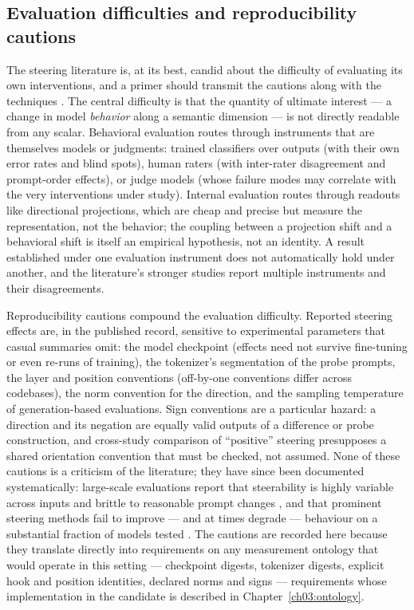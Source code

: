 \subsection{Evaluation difficulties and reproducibility cautions}\label{ch02:steering:evaluation}

The steering literature is, at its best, candid about the difficulty of evaluating its own interventions, and a primer should transmit the cautions along with the techniques \cite{zourepe}. The central difficulty is that the quantity of ultimate interest --- a change in model \emph{behavior} along a semantic dimension --- is not directly readable from any scalar. Behavioral evaluation routes through instruments that are themselves models or judgments: trained classifiers over outputs (with their own error rates and blind spots), human raters (with inter-rater disagreement and prompt-order effects), or judge models (whose failure modes may correlate with the very interventions under study). Internal evaluation routes through readouts like directional projections, which are cheap and precise but measure the representation, not the behavior; the coupling between a projection shift and a behavioral shift is itself an empirical hypothesis, not an identity. A result established under one evaluation instrument does not automatically hold under another, and the literature's stronger studies report multiple instruments and their disagreements.

Reproducibility cautions compound the evaluation difficulty. Reported steering effects are, in the published record, sensitive to experimental parameters that casual summaries omit: the model checkpoint (effects need not survive fine-tuning or even re-runs of training), the tokenizer's segmentation of the probe prompts, the layer and position conventions (off-by-one conventions differ across codebases), the norm convention for the direction, and the sampling temperature of generation-based evaluations. Sign conventions are a particular hazard: a direction and its negation are equally valid outputs of a difference or probe construction, and cross-study comparison of ``positive'' steering presupposes a shared orientation convention that must be checked, not assumed. None of these cautions is a criticism of the literature; they have since been documented systematically: large-scale evaluations report that steerability is highly variable across inputs and brittle to reasonable prompt changes \cite{tansteering}, and that prominent steering methods fail to improve --- and at times degrade --- behaviour on a substantial fraction of models tested \cite{dasilva}. The cautions are recorded here because they translate directly into requirements on any measurement ontology that would operate in this setting --- checkpoint digests, tokenizer digests, explicit hook and position identities, declared norms and signs --- requirements whose implementation in the candidate is described in Chapter~\ref{ch03:ontology}.

